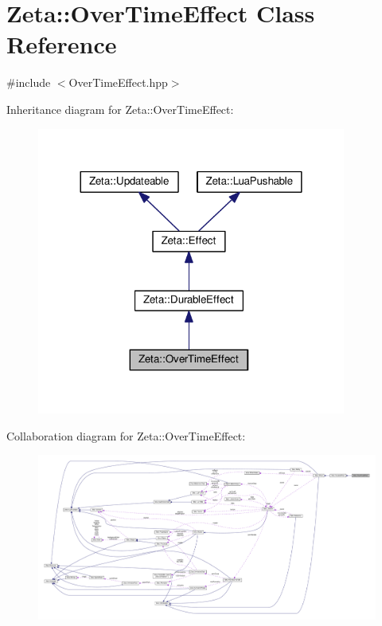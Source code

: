 \hypertarget{classZeta_1_1OverTimeEffect}{\section{Zeta\+:\+:Over\+Time\+Effect Class Reference}
\label{classZeta_1_1OverTimeEffect}
}


{\ttfamily \#include $<$Over\+Time\+Effect.\+hpp$>$}



Inheritance diagram for Zeta\+:\+:Over\+Time\+Effect\+:\nopagebreak
\begin{figure}[H]
\begin{center}
\leavevmode
\includegraphics[width=288pt]{classZeta_1_1OverTimeEffect__inherit__graph}
\end{center}
\end{figure}


Collaboration diagram for Zeta\+:\+:Over\+Time\+Effect\+:
\nopagebreak
\begin{figure}[H]
\begin{center}
\leavevmode
\includegraphics[width=350pt]{classZeta_1_1OverTimeEffect__coll__graph}
\end{center}
\end{figure}

